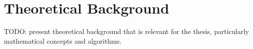 \chapter{Theoretical Background}\label{chap:background}

TODO: present theoretical background that is relevant for the thesis, particularly mathematical concepts and algorithms.